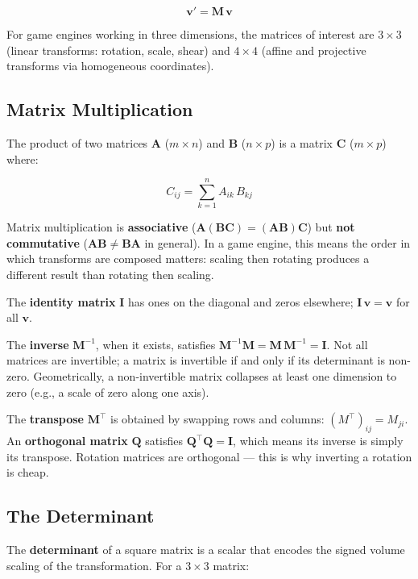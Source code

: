 \documentclass[
  11pt,
  letterpaper,
  DIV=11,
  numbers=noendperiod,
  twoside,
  open=right]{scrreprt}
\begin{document}
\[
\mathbf{v}' = \mathbf{M} \, \mathbf{v}
\]

For game engines working in three dimensions, the matrices of interest
are \(3 \times 3\) (linear transforms: rotation, scale, shear) and
\(4 \times 4\) (affine and projective transforms via homogeneous
coordinates).

\subsection{Matrix Multiplication}\label{matrix-multiplication}

The product of two matrices \(\mathbf{A}\) (\(m \times n\)) and
\(\mathbf{B}\) (\(n \times p\)) is a matrix \(\mathbf{C}\)
(\(m \times p\)) where:

\[
C_{ij} = \sum_{k=1}^{n} A_{ik} \, B_{kj}
\]

Matrix multiplication is \textbf{associative}
(\(\mathbf{A}(\mathbf{B}\mathbf{C}) = (\mathbf{A}\mathbf{B})\mathbf{C}\))
but \textbf{not commutative}
(\(\mathbf{A}\mathbf{B} \neq \mathbf{B}\mathbf{A}\) in general). In a
game engine, this means the order in which transforms are composed
matters: scaling then rotating produces a different result than rotating
then scaling.

The \textbf{identity matrix} \(\mathbf{I}\) has ones on the diagonal and
zeros elsewhere; \(\mathbf{I} \, \mathbf{v} = \mathbf{v}\) for all
\(\mathbf{v}\).

The \textbf{inverse} \(\mathbf{M}^{-1}\), when it exists, satisfies
\(\mathbf{M}^{-1} \mathbf{M} = \mathbf{M} \, \mathbf{M}^{-1} = \mathbf{I}\).
Not all matrices are invertible; a matrix is invertible if and only if
its determinant is non-zero. Geometrically, a non-invertible matrix
collapses at least one dimension to zero (e.g., a scale of zero along
one axis).

The \textbf{transpose} \(\mathbf{M}^\top\) is obtained by swapping rows
and columns: \((M^\top)_{ij} = M_{ji}\). An \textbf{orthogonal matrix}
\(\mathbf{Q}\) satisfies \(\mathbf{Q}^\top \mathbf{Q} = \mathbf{I}\),
which means its inverse is simply its transpose. Rotation matrices are
orthogonal --- this is why inverting a rotation is cheap.

\subsection{The Determinant}\label{the-determinant}

The \textbf{determinant} of a square matrix is a scalar that encodes the
signed volume scaling of the transformation. For a \(3 \times 3\)
matrix:
\end{document}
